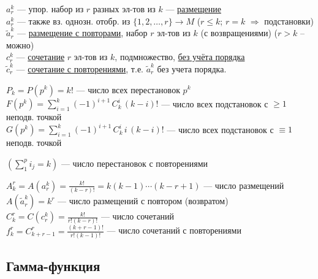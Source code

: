 \documentclass[a4paper,11pt]{article}
\begin{document}
$a^k_r$ --- упор. набор из $r$ разных эл-тов из $k$ --- \underline{размещение}
\\ \- \hspace{1cm} $a^k_r$ --- также вз. однозн. отобр. из
$\{1,2,\ldots,r\} \!\rightarrow\! M$ ($r \leqslant k$; $r=k$ $\Rightarrow$ подстановки)
\\
$\tilde{a}^k_r$ --- \underline{размещение с повторами}, набор $r$ эл-тов из $k$ (с возвращениями) ($r > k$ -- можно)
\\
$c_r^k$ --- \underline{сочетание} $r$ эл-тов из $k$, подмножество, \underline{без учёта порядка}
\\
$\tilde{c}_r^k$ --- \underline{сочетание с повторениями}, т.е. $\tilde{a}_r^k$ без учета порядка.

$P_k=P(p^k)=k!$ --- число всех перестановок $p^k$
\\
$\displaystyle F(p^k) = \sum_{i=1}^{k}{ (-1)^{i+1} \, C_k^i \, (k-i)! }$
--- число всех подстановок с $\geqslant 1$ неподв. точкой
\\
$\displaystyle G(p^k) = \sum_{i=1}^{k}{ (-1)^{i+1} \, C_k^i \, i \, (k-i)! }$
--- число всех подстановок с $\equiv 1$ неподв. точкой

$\displaystyle \left( \sum_{1}^{p} i_j = k \right) $
--- число перестановок с повторениями

$\displaystyle A^r_k = A(a^k_r) = \frac {k!} {(k-r)!} = k(k-1)\cdots(k-r+1)$
--- число размещений
\\
$A(\tilde{a}^k_r)=k^r$ --- число размещений с повтором (возвратом)
\\
$\displaystyle C^r_k = C(c^k_r) = \frac {k!} {r! (k-r)!}$ --- число сочетаний
\\
$\displaystyle f^r_k = C^r_{k+r-1} = \frac {(k+r-1)!} {r! (k-1)!}$
--- число сочетаний с повторениями


\subsection{Гамма-функция}

\begin{figure}\centering
\end{figure}
\end{document}
